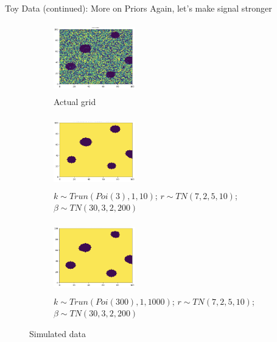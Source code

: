 \documentclass[10pt,mathserif]{beamer}
\begin{document}
\begin{frame}{Toy Data (continued): More on Priors}
Again, let's make signal stronger
\begin{figure}[t!]
    \centering
    \begin{subfigure}[t]{0.3\textwidth}
        \centering
        \includegraphics[height=1.2in, width=1.4in]{../BDC_gridactual}
        \caption{Actual grid}
    \end{subfigure}%
    \begin{subfigure}[t]{0.3\textwidth}
        \centering
        \includegraphics[height=1.2in, width=1.4in]{../BDC_grid7_c3_ss}
        \caption{ $k \sim Trun(Poi(3), 1, 10)$; $r \sim TN(7, 2, 5, 10)$; $\beta \sim TN(30, 3, 2, 200)$}
    \end{subfigure}%
        \begin{subfigure}[t]{0.3\textwidth}
        \centering
        \includegraphics[height=1.2in, width=1.4in]{../BDC_grid8_c300_ss}
        \caption{ $k \sim Trun(Poi(300), 1, 1000)$; $r \sim TN(7, 2, 5, 10)$; $\beta \sim TN(30, 3, 2, 200)$}
    \end{subfigure}
    \caption{Simulated data}
\end{figure}
\end{frame}
\end{document}
